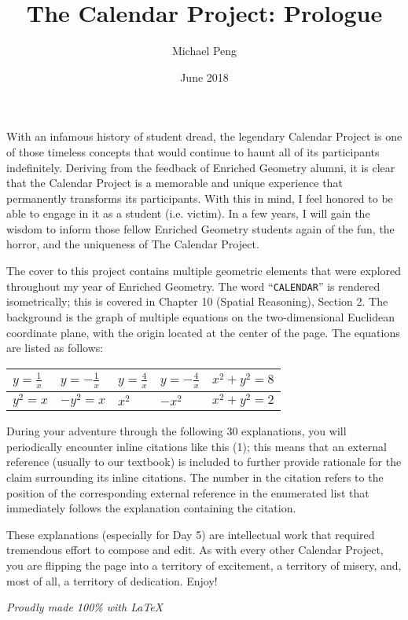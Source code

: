 \documentclass[letterpaper,12pt]{article}
\begin{document}
\title{The Calendar Project: Prologue}
\author{Michael Peng}
\date{June 2018}
\maketitle

With an infamous history of student dread, the legendary Calendar Project is one of those timeless concepts that would continue to haunt all of its participants indefinitely. Deriving from the feedback of Enriched Geometry alumni, it is clear that the Calendar Project is a memorable and unique experience that permanently transforms its participants. With this in mind, I feel honored to be able to engage in it as a student (i.e. victim). In a few years, I will gain the wisdom to inform those fellow Enriched Geometry students again of the fun, the horror, and the uniqueness of The Calendar Project\texttrademark.
 
The cover to this project contains multiple geometric elements that were explored throughout my year of Enriched Geometry. The word ``\texttt{CALENDAR}'' is rendered isometrically; this is covered in Chapter 10 (Spatial Reasoning), Section 2. The background is the graph of multiple equations on the two-dimensional Euclidean coordinate plane, with the origin located at the center of the page. The equations are listed as follows:


\begin{center}
\renewcommand{\arraystretch}{1.4}
\begin{tabular}{|l|l|l|l|l|}
\hline
$y=\frac{1}{x}$ & $y=-\frac{1}{x}$ & $y=\frac{4}{x}$ & $y=-\frac{4}{x}$ & $x^2+y^2=8$ \\
\hline
$y^2=x$ & $-y^2=x$ & $x^2$ & $-x^2$ & $x^2+y^2=2$ \\
\hline
\end{tabular}
\end{center}

During your adventure through the following 30 explanations, you will periodically encounter inline citations like this (1); this means that an external reference (usually to our textbook) is included to further provide rationale for the claim surrounding its inline citations. The number in the citation refers to the position of the corresponding external reference in the enumerated list that immediately follows the explanation containing the citation.

These explanations (especially for Day 5) are intellectual work that required tremendous effort to compose and edit. As with every other Calendar Project, you are flipping the page into a territory of excitement, a territory of misery, and, most of all, a territory of dedication. Enjoy!

\begin{center}
	\textit{
Proudly made 100\% with \LaTeX}
\end{center}
\end{document}
